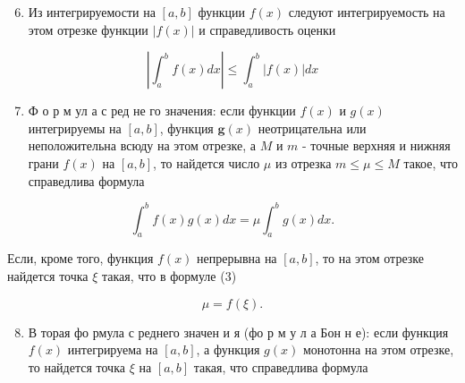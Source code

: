 \documentclass[10pt]{article}
\begin{document}
\begin{enumerate}

  \setcounter{enumi}{5}

  \item Из интегрируемости на $[a, b]$ функции $f(x)$ следуют интегрируемость на этом отрезке функции $|f(x)|$ и справедливость оценки

\end{enumerate}



\[

\left|\int_{a}^{b} f(x) d x\right| \leqslant \int_{a}^{b}|f(x)| d x

\]



\begin{enumerate}

  \setcounter{enumi}{6}

  \item Ф о р м ул а с ред не го значения: если функции $f(x)$ и $g(x)$ интегрируемы на $[a, b]$, функция $\boldsymbol{g}(x)$ неотрицательна или неположительна всюду на этом отрезке, а $M$ и $m$ - точные верхняя и нижняя грани $f(x)$ на $[a, b]$, то найдется число $\mu$ из отрезка $m \leqslant \mu \leqslant M$ такое, что справедлива формула

\end{enumerate}



\[

\int_{a}^{b} f(x) g(x) d x=\mu \int_{a}^{b} g(x) d x .

\]



Если, кроме того, функция $f(x)$ непрерывна на $[a, b]$, то на этом отрезке найдется точка $\xi$ такая, что в формуле (3)



\[

\mu=f(\xi) .

\]



\begin{enumerate}

  \setcounter{enumi}{7}

  \item В торая фо рмула с реднего значен и я (фо р м у л а Бон н е): если функция $f(x)$ интегрируема на $[a, b]$, а функция $g(x)$ монотонна на этом отрезке, то найдется точка $\xi$ на $[a, b]$ такая, что справедлива формула

\end{enumerate}
\end{document}
